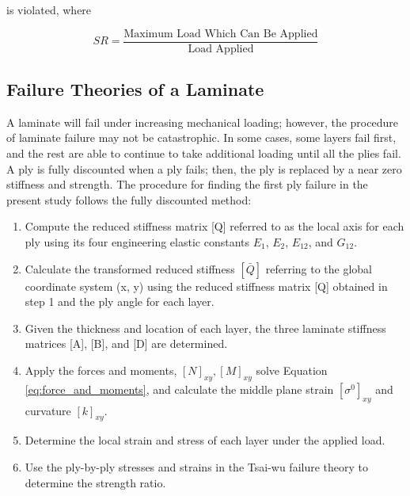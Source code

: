 \documentclass[USenglish]{article}
\begin{document}
is violated, where

\begin{equation} \label{eq:sr}S R=\frac{\text {Maximum Load Which Can Be Applied}}{\text {Load Applied}}
\end{equation}


\subsection{Failure Theories of a Laminate}
A laminate will fail under increasing mechanical loading; however, the procedure of laminate failure may not
be catastrophic.%
 In some cases, some layers fail first, and the rest are able to continue to take additional loading
 until all the plies fail. A ply is fully discounted when a ply fails; then, the ply is replaced
by a near zero stiffness and strength. %
The procedure for finding the first ply failure in the present
study follows the fully discounted method:

\begin{enumerate}
\item Compute the reduced stiffness matrix [Q] referred to as the local axis for each ply using its four engineering elastic constants $E_1 $, $E_2 $, $E_{12} $, and $G_{12} $.

\item Calculate the transformed reduced stiffness $[\bar{Q}] $ referring to the global coordinate system (x, y) using the reduced stiffness matrix [Q] obtained in step 1 and the ply angle for each layer.

\item  Given the thickness and location of each layer, the three laminate stiffness matrices [A], [B], and [D] are determined.

\item  Apply the forces and moments, $[N]_{xy}, [M]_{xy} $ solve
Equation \ref{eq:force_and_moments}, and calculate the middle plane strain $[\sigma ^{0}]_{xy} $ and curvature $[k]_{xy} $.

\item Determine the local strain and stress of each layer under the applied load.

\item  Use the ply-by-ply stresses and strains in the Tsai-wu failure theory to determine the strength ratio.
\end{enumerate}
\end{document}
